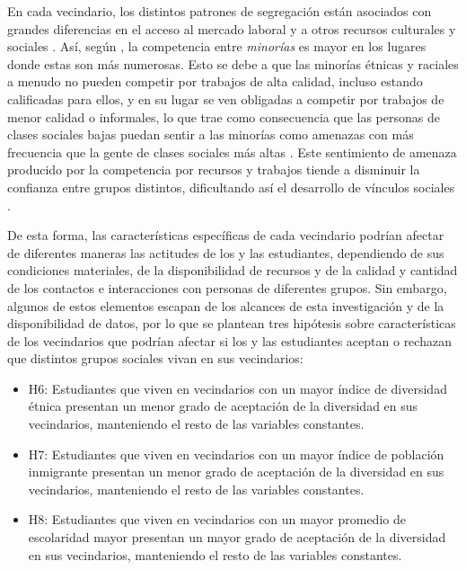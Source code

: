 \documentclass[12pt,twoside]{templates/facsothesis}
\begin{document}
En cada vecindario, los distintos patrones de segregación están asociados con grandes diferencias en el acceso al mercado laboral y a otros recursos culturales y sociales \citep{fernandez_breaking_2016}. Así, según \citet{baldassarri_diversity_2020}, la competencia entre \emph{minorías} es mayor en los lugares donde estas son más numerosas. Esto se debe a que las minorías étnicas y raciales a menudo no pueden competir por trabajos de alta calidad, incluso estando calificadas para ellos, y en su lugar se ven obligadas a competir por trabajos de menor calidad o informales, lo que trae como consecuencia que las personas de clases sociales bajas puedan sentir a las minorías como amenazas con más frecuencia que la gente de clases sociales más altas \citep{baldassarri_diversity_2020}. Este sentimiento de amenaza producido por la competencia por recursos y trabajos tiende a disminuir la confianza entre grupos distintos, dificultando así el desarrollo de vínculos sociales \citep{cote_untangling_2009}.

De esta forma, las características específicas de cada vecindario podrían afectar de diferentes maneras las actitudes de los y las estudiantes, dependiendo de sus condiciones materiales, de la disponibilidad de recursos y de la calidad y cantidad de los contactos e interacciones con personas de diferentes grupos. Sin embargo, algunos de estos elementos escapan de los alcances de esta investigación y de la disponibilidad de datos, por lo que se plantean tres hipótesis sobre características de los vecindarios que podrían afectar si los y las estudiantes aceptan o rechazan que distintos grupos sociales vivan en sus vecindarios:

\begin{itemize}
\item
  H6: Estudiantes que viven en vecindarios con un mayor índice de diversidad étnica presentan un menor grado de aceptación de la diversidad en sus vecindarios, manteniendo el resto de las variables constantes.
\item
  H7: Estudiantes que viven en vecindarios con un mayor índice de población inmigrante presentan un menor grado de aceptación de la diversidad en sus vecindarios, manteniendo el resto de las variables constantes.
\item
  H8: Estudiantes que viven en vecindarios con un mayor promedio de escolaridad mayor presentan un mayor grado de aceptación de la diversidad en sus vecindarios, manteniendo el resto de las variables constantes.
\end{itemize}
\end{document}
